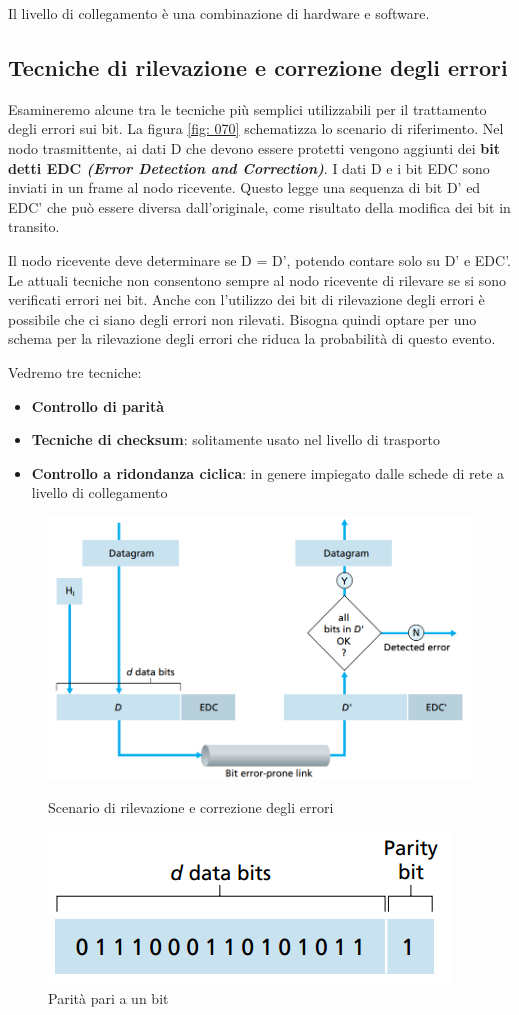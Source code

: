 \documentclass[11pt,a4paper]{article}
\begin{document}
Il livello di collegamento è una combinazione di hardware e software.

\subsection{Tecniche di rilevazione e correzione degli errori}
Esamineremo alcune tra le tecniche più semplici utilizzabili per il trattamento degli errori sui bit.  La figura \ref{fig: 070} schematizza lo scenario di riferimento. Nel nodo trasmittente, ai dati D che devono essere protetti vengono aggiunti dei \textbf{bit detti EDC \textit{(Error Detection and Correction)}}. I dati D e i bit EDC sono inviati in un frame al nodo ricevente. Questo legge una sequenza di bit D' ed EDC' che può essere diversa dall'originale, come risultato della modifica dei bit in transito.

Il nodo ricevente deve determinare se D = D', potendo contare solo su D' e EDC'. Le attuali tecniche non consentono sempre al nodo ricevente di rilevare se si sono verificati errori nei bit. Anche con l'utilizzo dei bit di rilevazione degli errori è possibile che ci siano degli errori non rilevati. Bisogna quindi optare per uno schema per la rilevazione degli errori che riduca la probabilità di questo evento.

Vedremo tre tecniche:
\begin{itemize}
	\item \textbf{Controllo di parità}
	\item \textbf{Tecniche di checksum}: solitamente usato nel livello di trasporto
	\item \textbf{Controllo a ridondanza ciclica}: in genere impiegato dalle schede di rete a livello di collegamento
\end{itemize}
\begin{figure}
	\includegraphics[scale=0.35]{img/070.png}
	\caption{Scenario di rilevazione e correzione degli errori}
	\label{fig: 070}
	\includegraphics[scale=0.6]{img/071.png}
	\caption{Parità pari a un bit}
	\label{fig: 071}
\end{figure}
\end{document}
